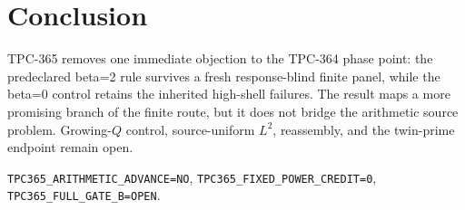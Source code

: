 \documentclass[10pt]{article}
\begin{document}
\section{Conclusion}

TPC-365 removes one immediate objection to the TPC-364 phase point: the
predeclared beta=2 rule survives a fresh response-blind finite panel, while
the beta=0 control retains the inherited high-shell failures.  The result
maps a more promising branch of the finite route, but it does not bridge the
arithmetic source problem.  Growing-$Q$ control, source-uniform $L^2$,
reassembly, and the twin-prime endpoint remain open.

\begin{center}\small
\texttt{TPC365\_ARITHMETIC\_ADVANCE=NO},\quad
\texttt{TPC365\_FIXED\_POWER\_CREDIT=0},\quad
\texttt{TPC365\_FULL\_GATE\_B=OPEN}.
\end{center}
\end{document}
